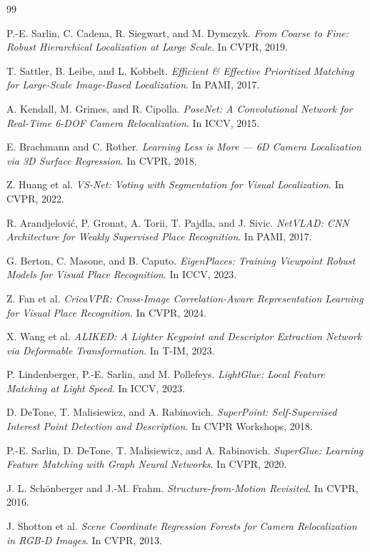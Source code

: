 \documentclass[12pt,a4paper]{ctexart}
\begin{document}
\begin{thebibliography}{99}

P.-E. Sarlin, C. Cadena, R. Siegwart, and M. Dymczyk.
\newblock \textit{From Coarse to Fine: Robust Hierarchical Localization at Large Scale}.
\newblock In CVPR, 2019.

T. Sattler, B. Leibe, and L. Kobbelt.
\newblock \textit{Efficient \& Effective Prioritized Matching for Large-Scale Image-Based Localization}.
\newblock In PAMI, 2017.

A. Kendall, M. Grimes, and R. Cipolla.
\newblock \textit{PoseNet: A Convolutional Network for Real-Time 6-DOF Camera Relocalization}.
\newblock In ICCV, 2015.

E. Brachmann and C. Rother.
\newblock \textit{Learning Less is More — 6D Camera Localization via 3D Surface Regression}.
\newblock In CVPR, 2018.

Z. Huang et al.
\newblock \textit{VS-Net: Voting with Segmentation for Visual Localization}.
\newblock In CVPR, 2022.

R. Arandjelovi\'{c}, P. Gronat, A. Torii, T. Pajdla, and J. Sivic.
\newblock \textit{NetVLAD: CNN Architecture for Weakly Supervised Place Recognition}.
\newblock In PAMI, 2017.

G. Berton, C. Masone, and B. Caputo.
\newblock \textit{EigenPlaces: Training Viewpoint Robust Models for Visual Place Recognition}.
\newblock In ICCV, 2023.

Z. Fan et al.
\newblock \textit{CricaVPR: Cross-Image Correlation-Aware Representation Learning for Visual Place Recognition}.
\newblock In CVPR, 2024.

X. Wang et al.
\newblock \textit{ALIKED: A Lighter Keypoint and Descriptor Extraction Network via Deformable Transformation}.
\newblock In T-IM, 2023.

P. Lindenberger, P.-E. Sarlin, and M. Pollefeys.
\newblock \textit{LightGlue: Local Feature Matching at Light Speed}.
\newblock In ICCV, 2023.

D. DeTone, T. Malisiewicz, and A. Rabinovich.
\newblock \textit{SuperPoint: Self-Supervised Interest Point Detection and Description}.
\newblock In CVPR Workshops, 2018.

P.-E. Sarlin, D. DeTone, T. Malisiewicz, and A. Rabinovich.
\newblock \textit{SuperGlue: Learning Feature Matching with Graph Neural Networks}.
\newblock In CVPR, 2020.

J. L. Sch\"{o}nberger and J.-M. Frahm.
\newblock \textit{Structure-from-Motion Revisited}.
\newblock In CVPR, 2016.

J. Shotton et al.
\newblock \textit{Scene Coordinate Regression Forests for Camera Relocalization in RGB-D Images}.
\newblock In CVPR, 2013.

\end{thebibliography}
\end{document}
